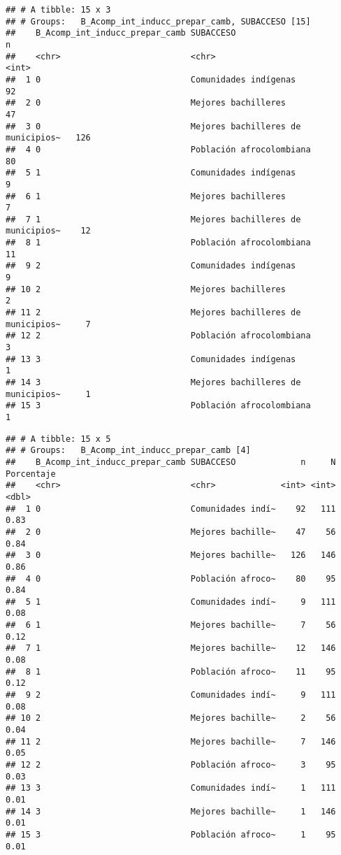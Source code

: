 \documentclass[]{article}
\theoremstyle{definition}
\theoremstyle{definition}
\theoremstyle{definition}
\theoremstyle{remark}
\begin{document}
\begin{verbatim}
## # A tibble: 15 x 3
## # Groups:   B_Acomp_int_inducc_prepar_camb, SUBACCESO [15]
##    B_Acomp_int_inducc_prepar_camb SUBACCESO                              n
##    <chr>                          <chr>                              <int>
##  1 0                              Comunidades indígenas                 92
##  2 0                              Mejores bachilleres                   47
##  3 0                              Mejores bachilleres de municipios~   126
##  4 0                              Población afrocolombiana              80
##  5 1                              Comunidades indígenas                  9
##  6 1                              Mejores bachilleres                    7
##  7 1                              Mejores bachilleres de municipios~    12
##  8 1                              Población afrocolombiana              11
##  9 2                              Comunidades indígenas                  9
## 10 2                              Mejores bachilleres                    2
## 11 2                              Mejores bachilleres de municipios~     7
## 12 2                              Población afrocolombiana               3
## 13 3                              Comunidades indígenas                  1
## 14 3                              Mejores bachilleres de municipios~     1
## 15 3                              Población afrocolombiana               1
\end{verbatim}

\begin{verbatim}
## # A tibble: 15 x 5
## # Groups:   B_Acomp_int_inducc_prepar_camb [4]
##    B_Acomp_int_inducc_prepar_camb SUBACCESO             n     N Porcentaje
##    <chr>                          <chr>             <int> <int>      <dbl>
##  1 0                              Comunidades indí~    92   111       0.83
##  2 0                              Mejores bachille~    47    56       0.84
##  3 0                              Mejores bachille~   126   146       0.86
##  4 0                              Población afroco~    80    95       0.84
##  5 1                              Comunidades indí~     9   111       0.08
##  6 1                              Mejores bachille~     7    56       0.12
##  7 1                              Mejores bachille~    12   146       0.08
##  8 1                              Población afroco~    11    95       0.12
##  9 2                              Comunidades indí~     9   111       0.08
## 10 2                              Mejores bachille~     2    56       0.04
## 11 2                              Mejores bachille~     7   146       0.05
## 12 2                              Población afroco~     3    95       0.03
## 13 3                              Comunidades indí~     1   111       0.01
## 14 3                              Mejores bachille~     1   146       0.01
## 15 3                              Población afroco~     1    95       0.01
\end{verbatim}
\end{document}
